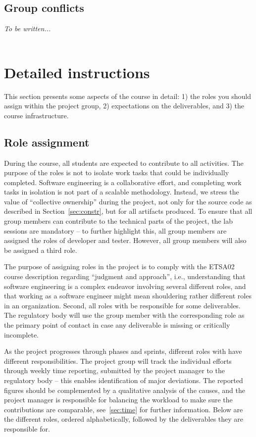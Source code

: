 \documentclass{scrreprt}
\begin{document}
\section{Group conflicts}
\emph{To be written...}\\\\

\chapter{Detailed instructions}
This section presents some aspects of the course in detail: 1) the roles you should assign within the project group, 2) expectations on the deliverables, and 3) the course infrastructure.

\section{Role assignment} \label{sec:roles} %
During the course, all students are expected to contribute to all activities. The purpose of the roles is not to isolate work tasks that could be individually completed. Software engineering is a collaborative effort, and completing work tasks in isolation is not part of a scalable methodology. Instead, we stress the value of ``collective ownership'' during the project, not only for the source code as described in Section~\ref{sec:constr}, but for all artifacts produced. To ensure that all group members can contribute to the technical parts of the project, the lab sessions are mandatory -- to further highlight this, all group members are assigned the roles of developer and tester. However, all group members will also be assigned a third role.

The purpose of assigning roles in the project is to comply with the ETSA02 course description regarding ``judgment and approach'', i.e., understanding that software engineering is a complex endeavor involving several different roles, and that working as a software engineer might mean shouldering rather different roles in an organization. Second, all roles with be responsible for some deliverables. The regulatory body will use the group member with the corresponding role as the primary point of contact in case any deliverable is missing or critically incomplete.

As the project progresses through phases and sprints, different roles with have different responsibilities. The project group will track the individual efforts through weekly time reporting, submitted by the project manager to the regulatory body -- this enables identification of major deviations. The reported figures should be complemented by a qualitative analysis of the causes, and the project manager is responsible for balancing the workload to make sure the contributions are comparable, see~\ref{sec:time} for further information. Below are the different roles, ordered alphabetically, followed by the deliverables they are responsible for.
\end{document}
